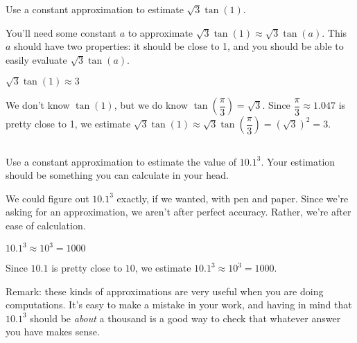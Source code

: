 \begin{question}\label{s3.4.1endapprox}
Use a constant approximation to estimate $\sqrt{3}\tan(1)$.
\end{question}
\begin{hint}
You'll need some constant $a$ to approximate $\sqrt{3}\tan(1) \approx \sqrt{3}\tan(a)$.
This $a$ should have two properties: it should be close to 1, and you should be able to easily evaluate $\sqrt{3}\tan(a)$.
\end{hint}
\begin{answer}
$\sqrt{3}\tan(1) \approx 3$
\end{answer}
\begin{solution}
We don't know $\tan(1)$, but we do know $\tan\left(\dfrac{\pi}{3}\right)=\sqrt{3}$.
Since $\dfrac{\pi}{3}\approx 1.047$ is pretty close to 1, we estimate
$\sqrt{3}\tan(1) \approx \sqrt{3}\tan\left(\dfrac{\pi}{3}\right)=\left(\sqrt{3}\right)^2=3.$
\end{solution}


\subsection*{\Application}



\begin{Mquestion}\label{s3.4.1quickapprox}
Use a constant approximation to estimate the value of $10.1^3$. Your estimation should be something you can calculate in your head.
\end{Mquestion}
\begin{hint}
We could figure out $10.1^3$ exactly, if we wanted, with pen and paper. Since we're asking for an approximation, we aren't after perfect accuracy. Rather, we're after ease of calculation.
\end{hint}
\begin{answer}
$10.1^3 \approx 10^3=1000$
\end{answer}
\begin{solution}
Since $10.1$ is pretty close to $10$, we estimate $10.1^3 \approx 10^3=1000$.

Remark: these kinds of approximations are very useful when you are doing computations. It's easy to make a mistake in your work, and having in mind that $10.1^3$ should be \emph{about} a thousand is a good way to check that whatever answer you have makes sense.
\end{solution}
